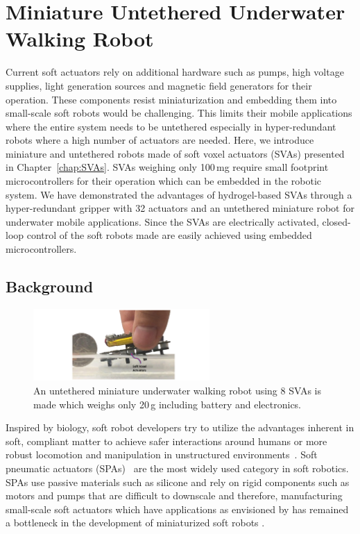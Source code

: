\graphicspath{{Images/untetheredWalker/}}

\chapter{Miniature Untethered Underwater Walking Robot}
\label{chap:untetheredWalker}
Current soft actuators rely on additional hardware such as pumps, high voltage supplies, light generation sources and magnetic field generators for their operation. 
These components resist miniaturization and embedding them into small-scale soft robots would be challenging. This limits their mobile applications where the entire system needs to be untethered especially in hyper-redundant robots where a high number of actuators are needed. Here, we introduce miniature and untethered robots made of soft voxel actuators (SVAs) presented in Chapter~\ref{chap:SVAs}. SVAs weighing only 100\,mg require small footprint microcontrollers for their operation which can be embedded in the robotic system. We have demonstrated the advantages of hydrogel-based SVAs through a hyper-redundant gripper with 32 actuators and an untethered miniature robot for underwater mobile applications. Since the SVAs are electrically activated, closed-loop control of the soft robots made are easily achieved using embedded microcontrollers.
\section{Background}

\begin{figure}[!ht]
\centering
\includegraphics[width=0.6\textwidth]{untWalker.pdf}
    \caption[Untethered miniature underwater walking robot]{An untethered miniature underwater walking robot using 8 SVAs is made which weighs only 20\,g including battery and electronics.}
    \label{fig:untWalker}
\end{figure}

Inspired by biology, soft robot developers try to utilize the advantages inherent in soft, compliant matter to achieve safer interactions around humans or more robust locomotion and manipulation in unstructured environments~\cite{martinez2013,laschi2012,tolley2014b,AdamBilodeau2015}.  
Soft pneumatic actuators (SPAs)~\cite{Gorissen2017, Branyan2018} are the most widely used category in soft robotics. SPAs use passive materials such as silicone and rely on rigid components such as motors and pumps that are difficult to downscale and therefore, manufacturing small-scale soft actuators which have applications as envisioned by \cite{Hines2017} has remained a bottleneck in the development of miniaturized soft robots \cite{Majidi2019}. 

